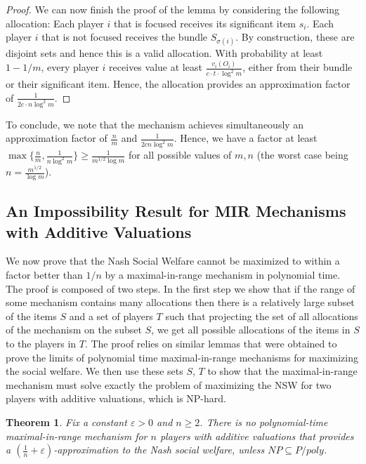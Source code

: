 \documentclass{article}
\newtheorem{theorem}{Theorem}\newtheorem{lemma}[theorem]{Lemma}\newtheorem{proposition}[theorem]{Proposition}\newtheorem{corollary}[theorem]{Corollary}\newtheorem{definition}[theorem]{Definition}\newtheorem{claim}[theorem]{Claim}\newtheorem*{claim*}{Claim}\newenvironment{subproof}{\begin{proof}[Proof of claim]}{\end{proof}}
\newcommand{\eps}{\varepsilon}
\begin{document}
\begin{proof}
We can now finish the proof of the lemma by considering the following allocation: Each player $i$ that is focused receives its significant item $s_i$. Each player $i$ that is not focused receives the bundle $S_{\sigma(i)}$. By construction, these are disjoint sets and hence this is a valid allocation. With probability at least $1-1/m$, every player $i$ receives value at least $\frac{v_i(O_i)}{c \cdot t \cdot \log^2 m}$, either from their bundle or their significant item.
Hence, the allocation provides an approximation factor of $\frac{1} {2c \cdot n \log^2 m}$.
\end{proof}

To conclude, we note that the mechanism achieves simultaneously an approximation factor of $\frac{n}{m}$ and $\frac{1}{2c n \log^2 m}$. 
Hence, we have a factor at least $\max \{\frac n m, \frac{1}{n \log^2 m} \} \geq \frac{1}{m^{1/2} \log m}$ for all possible values of $m,n$ (the worst case being $n = \frac{m^{1/2}}{\log m}$).



\subsection{An Impossibility Result for MIR Mechanisms with Additive Valuations}\label{subsec-hardness}

We now prove that the Nash Social Welfare cannot be maximized to within a factor better than $1/n$ by a maximal-in-range mechanism in polynomial time. The proof is composed of two steps. In the first step we show that if the range of some mechanism contains many allocations then there is a relatively large subset of the items $S$ and a set of players $T$ such that projecting the set of all allocations of the mechanism on the subset $S$, we get all possible allocations of the items in $S$ to the players in $T$. The proof relies on similar lemmas that were obtained to prove the limits of polynomial time maximal-in-range mechanisms for maximizing the social welfare. We then use these sets $S$, $T$ to show that the maximal-in-range mechanism must solve exactly the problem of maximizing the NSW for two players with additive valuations, which is NP-hard.

\begin{theorem}
Fix a constant $\eps>0$ and $n \geq 2$. There is no polynomial-time maximal-in-range mechanism for $n$ players with additive valuations that provides a $(\frac{1}{n}+\eps)$-approximation to the Nash social welfare, unless $NP\subseteq P/poly$.
\end{theorem}
\end{document}
